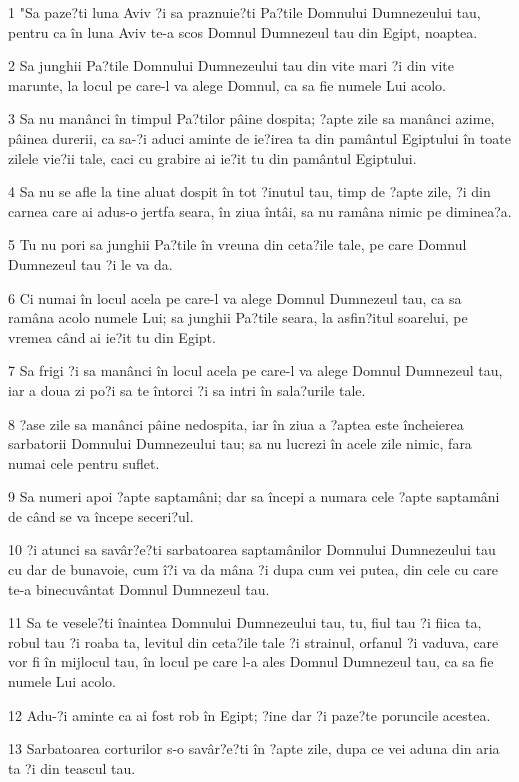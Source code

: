 \par 1 "Sa paze?ti luna Aviv ?i sa praznuie?ti Pa?tile Domnului Dumnezeului tau, pentru ca în luna Aviv te-a scos Domnul Dumnezeul tau din Egipt, noaptea.
\par 2 Sa junghii Pa?tile Domnului Dumnezeului tau din vite mari ?i din vite marunte, la locul pe care-l va alege Domnul, ca sa fie numele Lui acolo.
\par 3 Sa nu manânci în timpul Pa?tilor pâine dospita; ?apte zile sa manânci azime, pâinea durerii, ca sa-?i aduci aminte de ie?irea ta din pamântul Egiptului în toate zilele vie?ii tale, caci cu grabire ai ie?it tu din pamântul Egiptului.
\par 4 Sa nu se afle la tine aluat dospit în tot ?inutul tau, timp de ?apte zile, ?i din carnea care ai adus-o jertfa seara, în ziua întâi, sa nu ramâna nimic pe diminea?a.
\par 5 Tu nu pori sa junghii Pa?tile în vreuna din ceta?ile tale, pe care Domnul Dumnezeul tau ?i le va da.
\par 6 Ci numai în locul acela pe care-l va alege Domnul Dumnezeul tau, ca sa ramâna acolo numele Lui; sa junghii Pa?tile seara, la asfin?itul soarelui, pe vremea când ai ie?it tu din Egipt.
\par 7 Sa frigi ?i sa manânci în locul acela pe care-l va alege Domnul Dumnezeul tau, iar a doua zi po?i sa te întorci ?i sa intri în sala?urile tale.
\par 8 ?ase zile sa manânci pâine nedospita, iar în ziua a ?aptea este încheierea sarbatorii Domnului Dumnezeului tau; sa nu lucrezi în acele zile nimic, fara numai cele pentru suflet.
\par 9 Sa numeri apoi ?apte saptamâni; dar sa începi a numara cele ?apte saptamâni de când se va începe seceri?ul.
\par 10 ?i atunci sa savâr?e?ti sarbatoarea saptamânilor Domnului Dumnezeului tau cu dar de bunavoie, cum î?i va da mâna ?i dupa cum vei putea, din cele cu care te-a binecuvântat Domnul Dumnezeul tau.
\par 11 Sa te vesele?ti înaintea Domnului Dumnezeului tau, tu, fiul tau ?i fiica ta, robul tau ?i roaba ta, levitul din ceta?ile tale ?i strainul, orfanul ?i vaduva, care vor fi în mijlocul tau, în locul pe care l-a ales Domnul Dumnezeul tau, ca sa fie numele Lui acolo.
\par 12 Adu-?i aminte ca ai fost rob în Egipt; ?ine dar ?i paze?te poruncile acestea.
\par 13 Sarbatoarea corturilor s-o savâr?e?ti în ?apte zile, dupa ce vei aduna din aria ta ?i din teascul tau.
